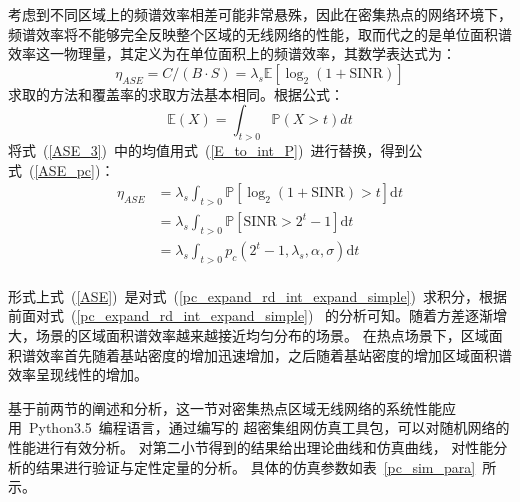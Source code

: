考虑到不同区域上的频谱效率相差可能非常悬殊，因此在密集热点的网络环境下，
频谱效率将不能够完全反映整个区域的无线网络的性能，取而代之的是单位面积谱效率这一物理量，其定义为在单位面积上的频谱效率，其数学表达式为：
\begin{equation}\label{ASE_3}
  \eta_{ASE}=C/(B\cdot S) = \lambda_s\mathbb{E}[\log_2(1+\mathrm{SINR})]
\end{equation}
求取的方法和覆盖率的求取方法基本相同。根据公式：
\begin{equation}\label{E_to_int_P}
\mathbb{E}(X)=\int_{t>0}\mathbb{P}(X>t)dt
\end{equation}
将式~(\ref{ASE_3})~中的均值用式~(\ref{E_to_int_P})~进行替换，得到公式~(\ref{ASE_pc})：
\begin{equation}\label{ASE_pc}
  \begin{aligned}
  \eta_{ASE} &= \lambda_s\int_{t>0} \mathbb{P}[\log_2(1 + \mathrm{SINR}) > t] \mathrm{d} t \\
             &= \lambda_s\int_{t>0} \mathbb{P}[\mathrm{SINR} > 2 ^ {t}-1] \mathrm{d} t \\
             &= \lambda_s\int_{t>0} p_c(2^{t}-1,\lambda_s,\alpha,\sigma) \mathrm{d} t \\
  \end{aligned}
\end{equation}

形式上式~(\ref{ASE})~是对式~(\ref{pc_expand_rd_int_expand_simple})~求积分，根据前面对式~(\ref{pc_expand_rd_int_expand_simple})~
的分析可知。随着方差逐渐增大，场景的区域面积谱效率越来越接近均匀分布的场景。
在热点场景下，区域面积谱效率首先随着基站密度的增加迅速增加，之后随着基站密度的增加区域面积谱效率呈现线性的增加。

基于前两节的阐述和分析，这一节对密集热点区域无线网络的系统性能应用~Python3.5~编程语言，通过编写的
超密集组网仿真工具包，可以对随机网络的性能进行有效分析。
对第二小节得到的结果给出理论曲线和仿真曲线，
对性能分析的结果进行验证与定性定量的分析。
具体的仿真参数如表~\ref{pc_sim_para}~所示。

